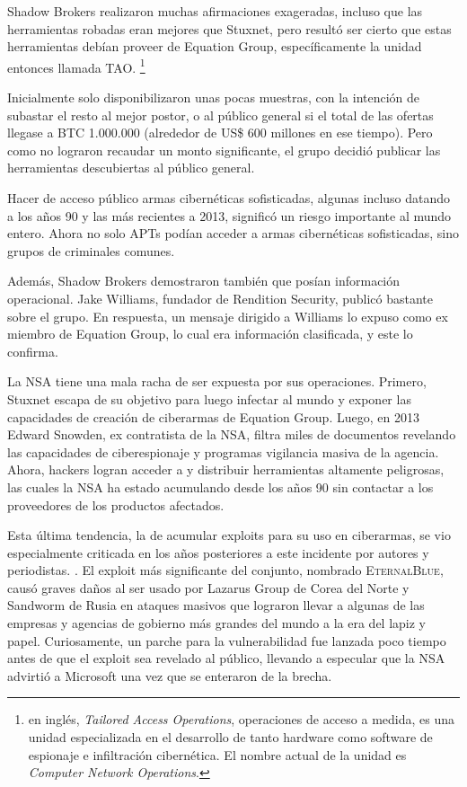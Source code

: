 \documentclass{article}
\begin{document}
Shadow Brokers realizaron muchas afirmaciones exageradas, incluso que las herramientas robadas eran mejores que Stuxnet, pero resultó ser cierto que estas herramientas debían proveer de Equation Group, específicamente la unidad entonces llamada TAO. \footnote{en inglés, {\it Tailored Access Operations}, operaciones de acceso a medida, es una unidad especializada en el desarrollo de tanto hardware como software de espionaje e infiltración cibernética. El nombre actual de la unidad es {\it Computer Network Operations}.} \autocite{sophos-shadow-brokers}

Inicialmente solo disponibilizaron unas pocas muestras, con la intención de subastar el resto al mejor postor, o al público general si el total de las ofertas llegase a BTC 1.000.000 (alrededor de US\$ 600 millones en ese tiempo). Pero como no lograron recaudar un monto significante, el grupo decidió publicar las herramientas descubiertas al público general.

Hacer de acceso público armas cibernéticas sofisticadas, algunas incluso datando a los años 90 y las más recientes a 2013, significó un riesgo importante al mundo entero. Ahora no solo APTs podían acceder a armas cibernéticas sofisticadas, sino grupos de criminales comunes.

Además, Shadow Brokers demostraron también que posían información operacional. Jake Williams, fundador de Rendition Security, publicó bastante sobre el grupo. En respuesta, un mensaje dirigido a Williams lo expuso como ex miembro de Equation Group, lo cual era información clasificada, y este lo confirma. \autocite{nytimes-shadow-brokers} \autocite{darknetdiaries-shadow-brokers}

La NSA tiene una mala racha de ser expuesta por sus operaciones. Primero, Stuxnet escapa de su objetivo para luego infectar al mundo y exponer las capacidades de creación de ciberarmas de Equation Group. Luego, en 2013 Edward Snowden, ex contratista de la NSA, filtra miles de documentos revelando las capacidades de ciberespionaje y programas vigilancia masiva de la agencia. Ahora, hackers logran acceder a y distribuir herramientas altamente peligrosas, las cuales la NSA ha estado acumulando desde los años 90 sin contactar a los proveedores de los productos afectados.

Esta última tendencia, la de acumular exploits para su uso en ciberarmas, se vio especialmente criticada en los años posteriores a este incidente por autores y periodistas. \autocite{schneier-shadow-brokers}. El exploit más significante del conjunto, nombrado \textsc{EternalBlue}, causó graves daños al ser usado por Lazarus Group de Corea del Norte y Sandworm de Rusia en ataques masivos que lograron llevar a algunas de las empresas y agencias de gobierno más grandes del mundo a la era del lapiz y papel. Curiosamente, un parche para la vulnerabilidad fue lanzada poco tiempo antes de que el exploit sea revelado al público, llevando a especular que la NSA advirtió a Microsoft una vez que se enteraron de la brecha.
\end{document}
